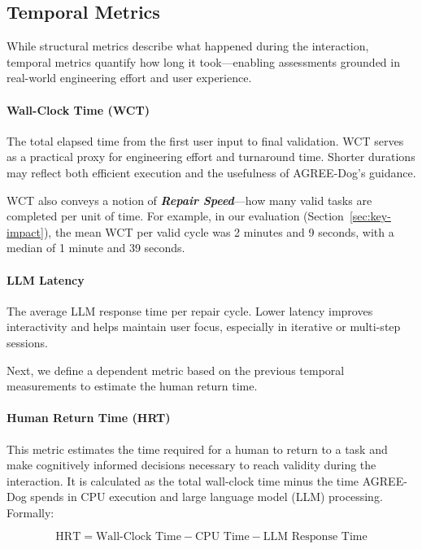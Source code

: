 \subsection{Temporal Metrics}

While structural metrics describe what happened during the interaction, temporal metrics quantify how long it took—enabling assessments grounded in real-world engineering effort and user experience.

\paragraph{\textbf{Wall-Clock Time (WCT)}} The total elapsed time from the first user input to final validation. WCT serves as a practical proxy for engineering effort and turnaround time. Shorter durations may reflect both efficient execution and the usefulness of AGREE-Dog’s guidance.

WCT also conveys a notion of \emph{\textbf{Repair Speed}}—how many valid tasks are completed per unit of time. For example, in our evaluation (Section~\ref{sec:key-impact}), the mean WCT per valid cycle was 2 minutes and 9 seconds, with a median of 1 minute and 39 seconds.


\paragraph{\textbf{LLM Latency}} The average LLM response time per repair cycle. Lower latency improves interactivity and helps maintain user focus, especially in iterative or multi-step sessions.

Next, we define a dependent metric based on the previous temporal measurements to estimate the human return time.

\paragraph{\textbf{Human Return Time (HRT)}} 
This metric estimates the time required for a human to return to a task and make cognitively informed decisions necessary to reach validity during the interaction. It is calculated as the total wall-clock time minus the time AGREE-Dog spends in CPU execution and large language model (LLM) processing. Formally:

\begin{equation}
\text{HRT} = \text{Wall-Clock Time} - \text{CPU Time} - \text{LLM Response Time}
\label{eq:hrt}
\end{equation}


